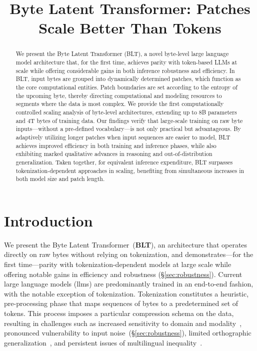 \title{Byte Latent Transformer: Patches Scale Better Than Tokens}

\begin{abstract}
We present the Byte Latent Transformer ({\textsc BLT}), a novel byte-level large language model architecture that, for the first time, achieves parity with token-based LLMs at scale while offering considerable gains in both inference robustness and efficiency.
In {\textsc BLT}, input bytes are grouped into dynamically determined patches, which function as the core computational entities. Patch boundaries are set according to the entropy of the upcoming byte, thereby directing computational and modeling resources to segments where the data is most complex. We provide the first computationally controlled scaling analysis of byte-level architectures, extending up to 8B parameters and 4T bytes of training data. Our findings verify that large-scale training on raw byte inputs—without a pre-defined vocabulary—is not only practical but advantageous. By adaptively utilizing longer patches when input sequences are easier to model, {\textsc BLT} achieves improved efficiency in both training and inference phases, while also exhibiting marked qualitative advances in reasoning and out-of-distribution generalization. Taken together, for equivalent inference expenditure, {\textsc BLT} surpasses tokenization-dependent approaches in scaling, benefiting from simultaneous increases in both model size and patch length.
\end{abstract}

\section{Introduction}
\label{section:intro}

We present the Byte Latent Transformer~(\textbf{BLT}), an architecture that operates directly on raw bytes without relying on tokenization, and demonstrates—for the first time—parity with tokenization-dependent models at large scale while offering notable gains in efficiency and robustness (\S\ref{sec:robustness}).
Current large language models (llms) are predominantly trained in an end-to-end fashion, with the notable exception of tokenization. Tokenization constitutes a heuristic, pre-processing phase that maps sequences of bytes to a predetermined set of tokens. This process imposes a particular compression schema on the data, resulting in challenges such as increased sensitivity to domain and modality~\citep{dagangetting}, pronounced vulnerability to input noise~(\S\ref{sec:robustness}), limited orthographic generalization~\citep{edman2024cute}, and persistent issues of multilingual inequality~\citep{liang2023xlm,petrov2024language,limisiewicz2024myte}.

